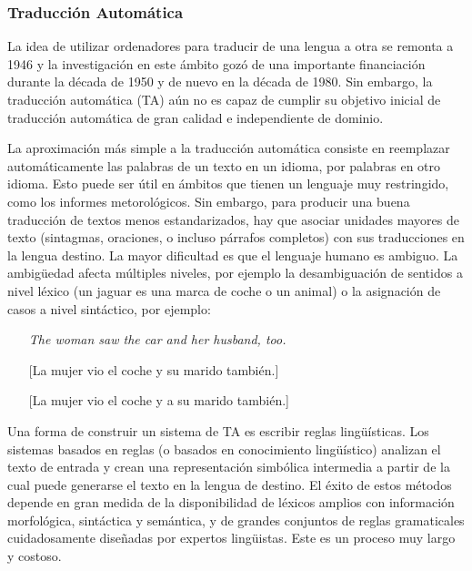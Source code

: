 \begin{multicols}{2}
\subsubsection{Traducción Automática}

La idea de utilizar ordenadores para traducir de una lengua a otra se remonta a 1946 y la investigación en este ámbito gozó de una importante financiación durante la década de 1950 y de nuevo en la década de 1980. Sin embargo, la traducción automática (TA) aún no es capaz de cumplir su objetivo inicial de traducción automática de gran calidad e independiente de dominio.


La aproximación más simple a la traducción automática consiste en reemplazar automáticamente las palabras de un texto en un idioma, por palabras en otro idioma. Esto puede ser útil en ámbitos que tienen un lenguaje muy restringido, como los informes metorológicos. Sin embargo, para producir una buena traducción de textos menos estandarizados, hay que asociar unidades mayores de texto (sintagmas, oraciones, o incluso párrafos completos) con sus traducciones en la lengua destino. La mayor dificultad es que el lenguaje humano es ambiguo. La ambigüedad afecta múltiples niveles, por ejemplo la desambiguación de sentidos a nivel léxico (un jaguar es una marca de coche o un animal) o la asignación de casos a nivel sintáctico, por ejemplo:

\begin{itemize}
  \item[] \textit{The woman saw the car and her husband, too.}
  \item[] [La mujer vio el coche y su marido también.]
  \item[] [La mujer vio el coche y a su marido también.]
\end{itemize}

Una forma de construir un sistema de TA es escribir reglas lingüísticas. Los sistemas basados en reglas (o basados en conocimiento lingüístico) analizan el texto de entrada y crean una representación simbólica intermedia a partir de la cual puede generarse el texto en la lengua de destino. El éxito de estos métodos depende en gran medida de la disponibilidad de léxicos amplios con información morfológica, sintáctica y semántica, y de grandes conjuntos de reglas gramaticales cuidadosamente diseñadas por expertos lingüistas. Este es un proceso muy largo y costoso.


\end{multicols}
